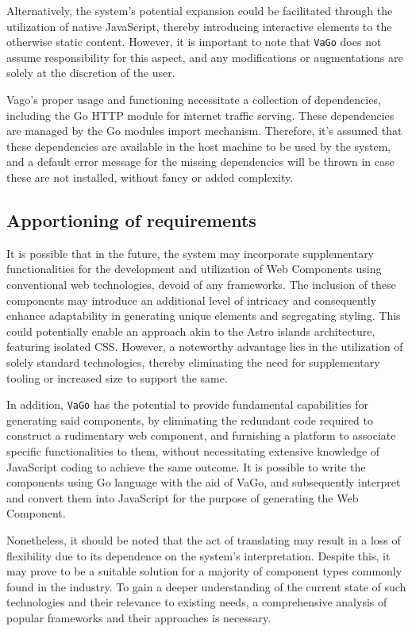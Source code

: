 Alternatively, the system's potential expansion could be facilitated
through the utilization of native JavaScript, thereby introducing
interactive elements to the otherwise static content. However, it is
important to note that \texttt{VaGo} does not assume responsibility for
this aspect, and any modifications or augmentations are solely at the
discretion of the user.

Vago's proper usage and functioning necessitate a collection of
dependencies, including the Go HTTP module for internet traffic serving.
These dependencies are managed by the Go modules import mechanism.
Therefore, it's assumed that these dependencies are available in the
host machine to be used by the system, and a default error message for
the missing dependencies will be thrown in case these are not installed,
without fancy or added complexity.

\subsection{Apportioning of
requirements}\label{subsubsec:apportioning-of-requirements}

It is possible that in the future, the system may incorporate
supplementary functionalities for the development and utilization of Web
Components using conventional web technologies, devoid of any
frameworks. The inclusion of these components may introduce an
additional level of intricacy and consequently enhance adaptability in
generating unique elements and segregating styling. This could
potentially enable an approach akin to the Astro islands architecture,
featuring isolated CSS. However, a noteworthy advantage lies in the
utilization of solely standard technologies, thereby eliminating the
need for supplementary tooling or increased size to support the same.

In addition, \texttt{VaGo} has the potential to provide fundamental
capabilities for generating said components, by eliminating the
redundant code required to construct a rudimentary web component, and
furnishing a platform to associate specific functionalities to them,
without necessitating extensive knowledge of JavaScript coding to
achieve the same outcome. It is possible to write the components using
Go language with the aid of VaGo, and subsequently interpret and convert
them into JavaScript for the purpose of generating the Web Component.

Nonetheless, it should be noted that the act of translating may result
in a loss of flexibility due to its dependence on the system's
interpretation. Despite this, it may prove to be a suitable solution for
a majority of component types commonly found in the industry. To gain a
deeper understanding of the current state of such technologies and their
relevance to existing needs, a comprehensive analysis of popular
frameworks and their approaches is necessary.
